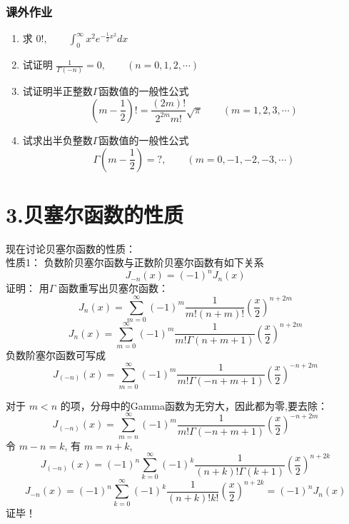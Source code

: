 \begin{frame}
	\frametitle{课外作业}
	\begin{enumerate}
		\item 求 $0!, \qquad \int_{0}^{\infty} x^2 e^{-\frac{1}{2}x^2} dx $
		\item 试证明 $ \frac{1}{\Gamma(-n)} =0, \qquad (n=0,1,2, \cdots) $
		\item 试证明半正整数$\Gamma$函数值的一般性公式
		\[ (m-\frac{1}{2})! =\frac{(2m)!}{2^{2m} m!}\sqrt{\pi} \qquad (m=1,2,3,\cdots) \]
		\item 试求出半负整数$\Gamma$函数值的一般性公式
		\[\Gamma(m-\frac{1}{2})=?, \qquad (m=0,-1,-2,-3,\cdots)\]	
	\end{enumerate}
\end{frame}

\section{3.贝塞尔函数的性质}

\begin{frame}
	现在讨论贝塞尔函数的性质：\\
	\alert{性质1：} 负数阶贝塞尔函数与正数阶贝塞尔函数有如下关系
	\begin{equation*}
		J_{-n}(x)=(-1)^n J_n(x)
	\end{equation*}	
	\alert{证明：}  
	用$\Gamma$ 函数重写出贝塞尔函数：
	\begin{equation*}
		J_n(x) = \sum\limits_{m=0}^{\infty} (-1)^m  \frac{1}{m! (n+m) ! } (\frac{x}{2})^{n+2m} 
	\end{equation*}	
	\begin{equation*}
		J_n(x) = \sum\limits_{m=0}^{\infty} (-1)^m  \frac{1}{m! \Gamma(n+m+1) } (\frac{x}{2})^{n+2m} 
	\end{equation*}	
	负数阶塞尔函数可写成
	\begin{equation*}
		J_{(-n)}(x) = \sum\limits_{m=0}^{\infty} (-1)^m  \frac{1}{m! \Gamma(-n+m+1) } (\frac{x}{2})^{-n+2m} 
	\end{equation*}	
\end{frame}	

\begin{frame}
	对于 $m<n$ 的项，分母中的Gamma函数为无穷大，因此都为零,要去除：
	\begin{equation*}
		J_{(-n)}(x) = \sum\limits_{m=n}^{\infty} (-1)^m  \frac{1}{m! \Gamma(-n+m+1) } (\frac{x}{2})^{-n+2m} 
	\end{equation*}	
	令 $m-n=k$, 有 $m=n+k $, 
	\begin{equation*}
		J_{(-n)}(x) = (-1)^n\sum\limits_{k=0}^{\infty} (-1)^k  \frac{1}{(n+k)! \Gamma(k+1) } (\frac{x}{2})^{n+2k} 
	\end{equation*}	
	\begin{equation*}
		J_{-n} (x) = (-1)^n\sum\limits_{k=0}^{\infty} (-1)^k  \frac{1}{(n+k)! k! } (\frac{x}{2})^{n+2k} =(-1)^n J_{n} (x)
	\end{equation*}	
	证毕！
\end{frame}	

